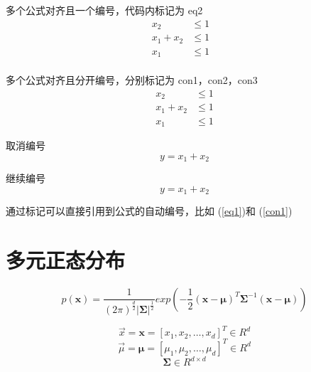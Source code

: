 \documentclass[UTF8]{ctexart}
\begin{document}
多个公式对齐且一个编号，代码内标记为 eq2
\begin{equation}\label{eq2}
\begin{aligned}
	x_2         & \leq 1\\
	x_1 + x_2 & \leq 1\\
	x_1 \ \ \ \ \ \ \ & \leq 1 &\\
\end{aligned}
\end{equation}\par

多个公式对齐且分开编号，分别标记为 con1，con2，con3
\begin{eqnarray}
	\label{con1} x_2         & \leq 1 \\
	\label{con2} x_1 + x_2 & \leq 1 \\
	\label{con3} x_1 \ \ \ \ \ \ \ & \leq 1
\end{eqnarray}\par

取消编号
\begin{equation*}
y = x_1 + x_2
\end{equation*}\par

继续编号
\begin{equation}
y = x_1 + x_2
\end{equation}\par

通过标记可以直接引用到公式的自动编号，比如 (\ref{eq1})和 (\ref{con1})\par

\newpage

\section{多元正态分布}

$$p(\bm{x})=\frac{1}{(2\pi)^{\frac{d}{2}}|\bm{\Sigma}|^{\frac{1}{2}}}exp(-\frac{1}{2}(\bm{x}-\bm{\mu})^T\bm{\Sigma}^{-1}(\bm{x}-\bm{\mu}))$$\par
$$\overrightarrow{x} = \bm{x}=[x_1,x_2,\dots,x_d]^T \in R^d$$
$$\overrightarrow{\mu} = \bm{\mu}=[\mu_1,\mu_2,\dots,\mu_d]^T \in R^d$$
$$\bm{\Sigma} \in R^{d \times d}$$\par

\newpage
\end{document}
